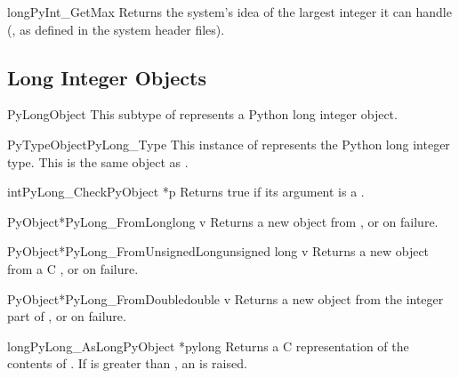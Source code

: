 \documentclass{manual}
\begin{document}
\begin{cfuncdesc}{long}{PyInt_GetMax}{}
Returns the system's idea of the largest integer it can handle
(, as defined in the system
header files).
\end{cfuncdesc}


\subsection{Long Integer Objects \label{longObjects}}

\begin{ctypedesc}{PyLongObject}
This subtype of  represents a Python long integer
object.
\end{ctypedesc}

\begin{cvardesc}{PyTypeObject}{PyLong_Type}
This instance of  represents the Python long
integer type.  This is the same object as .
\end{cvardesc}

\begin{cfuncdesc}{int}{PyLong_Check}{PyObject *p}
Returns true if its argument is a .
\end{cfuncdesc}

\begin{cfuncdesc}{PyObject*}{PyLong_FromLong}{long v}
Returns a new  object from , or \NULL{} on
failure.
\end{cfuncdesc}

\begin{cfuncdesc}{PyObject*}{PyLong_FromUnsignedLong}{unsigned long v}
Returns a new  object from a C , or \NULL{} on failure.
\end{cfuncdesc}

\begin{cfuncdesc}{PyObject*}{PyLong_FromDouble}{double v}
Returns a new  object from the integer part of
, or \NULL{} on failure.
\end{cfuncdesc}

\begin{cfuncdesc}{long}{PyLong_AsLong}{PyObject *pylong}
Returns a C  representation of the contents of
.  If  is greater than
, an  is
raised.
\end{cfuncdesc}
\end{document}
